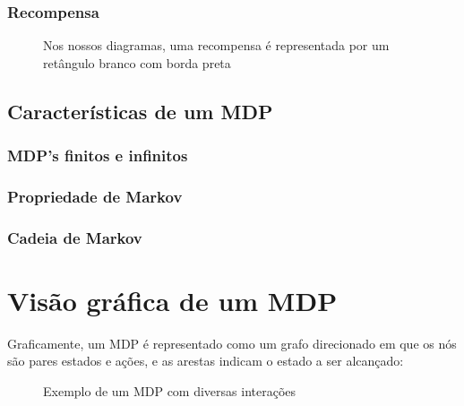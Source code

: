 \documentclass{article}
\begin{document}
            \subsubsection{Recompensa}
        
                \begin{figure}[ht]
                    \centering
                    \caption{Nos nossos diagramas, uma recompensa é representada por um retângulo branco com borda preta}
                    \label{diag:reward-label}
                \end{figure}
        
        \subsection{Características de um MDP}
        
            \subsubsection{MDP's finitos e infinitos}
            
            \subsubsection{Propriedade de Markov}
            
            \subsubsection{Cadeia de Markov}
            
    \section{Visão gráfica de um MDP}
    
        Graficamente, um MDP é representado como um grafo direcionado em que os nós são pares estados e ações, e as arestas indicam o estado a ser alcançado:
    
        \begin{figure}[ht]
            \centering
            \mdpbig
            \caption{Exemplo de um MDP com diversas interações}
            \label{diag:mdp-big}
        \end{figure}
        
\end{document}
